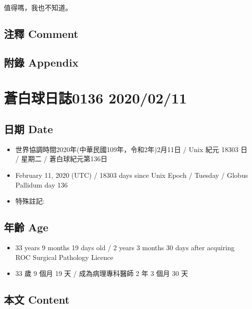 \documentclass[
]{article}
\providecommand{\tightlist}{%
  \setlength{\itemsep}{0pt}\setlength{\parskip}{0pt}}
\begin{document}
值得嗎，我也不知道。

\hypertarget{ux6ce8ux91cb-comment-70}{%
\subsection{注釋 Comment}\label{ux6ce8ux91cb-comment-70}}

\hypertarget{ux9644ux9304-appendix-71}{%
\subsection{附錄 Appendix}\label{ux9644ux9304-appendix-71}}

\hypertarget{ux84bcux767dux7403ux65e5ux8a8c0136-20200211}{%
\section{蒼白球日誌0136
2020/02/11}\label{ux84bcux767dux7403ux65e5ux8a8c0136-20200211}}

\hypertarget{ux65e5ux671f-date-72}{%
\subsection{日期 Date}\label{ux65e5ux671f-date-72}}

\begin{itemize}
\tightlist
\item
  世界協調時間2020年(中華民國109年，令和2年)2月11日 / Unix 紀元 18303 日
  / 星期二 / 蒼白球紀元第136日
\item
  February 11, 2020 (UTC) / 18303 days since Unix Epoch / Tuesday /
  Globus Pallidum day 136
\item
  特殊註記:
\end{itemize}

\hypertarget{ux5e74ux9f61-age-72}{%
\subsection{年齡 Age}\label{ux5e74ux9f61-age-72}}

\begin{itemize}
\tightlist
\item
  33 years 9 months 19 days old / 2 years 3 months 30 days after
  acquiring ROC Surgical Pathology Licence
\item
  33 歲 9 個月 19 天 / 成為病理專科醫師 2 年 3 個月 30 天
\end{itemize}

\hypertarget{ux672cux6587-content-72}{%
\subsection{本文 Content}\label{ux672cux6587-content-72}}
\end{document}

